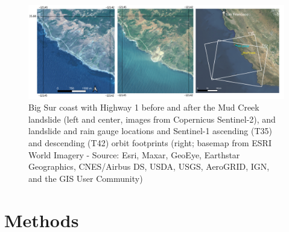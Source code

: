 \documentclass[journal abbreviation, manuscript]{copernicus}
\begin{document}
\begin{figure}[hbt!]
    \centering
    \includegraphics[width = \textwidth]{OverviewFigure_3.pdf}
    \caption{Big Sur coast with Highway 1 before and after the Mud Creek landslide (left and center, images from Copernicus Sentinel-2), and landslide and rain gauge locations and Sentinel-1 ascending (T35) and descending (T42) orbit footprints (right; basemap from ESRI World Imagery - Source: Esri, Maxar, GeoEye, Earthstar Geographics, CNES/Airbus DS, USDA, USGS, AeroGRID, IGN, and the GIS User Community)}
    \label{fig:figure1}
\end{figure}


\section{Methods}
\end{document}
